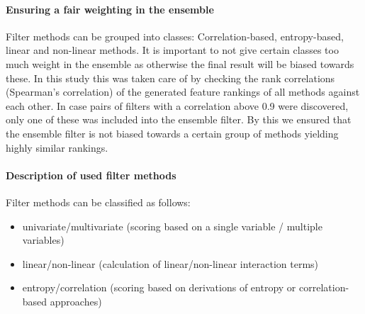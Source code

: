 \documentclass[letterpaper, peerreview]{IEEEtran}
\begin{document}
\paragraph{Ensuring a fair weighting in the ensemble}

Filter methods can be grouped into classes: Correlation-based, entropy-based, linear and non-linear methods.
It is important to not give certain classes too much weight in the ensemble as otherwise the final result will be biased towards these.
In this study this was taken care of by checking the rank correlations (Spearman's correlation) of the generated feature rankings of all methods against each other.
In case pairs of filters with a correlation above 0.9 were discovered, only one of these was included into the ensemble filter.
By this we ensured that the ensemble filter is not biased towards a certain group of methods yielding highly similar rankings.

\paragraph{Description of used filter methods}

Filter methods can be classified as follows:

\begin{itemize}
	\item univariate/multivariate (scoring based on a single variable / multiple variables)
	\item linear/non-linear (calculation of linear/non-linear interaction terms)
	\item entropy/correlation (scoring based on derivations of entropy or correlation-based approaches)
\end{itemize}
\end{document}
